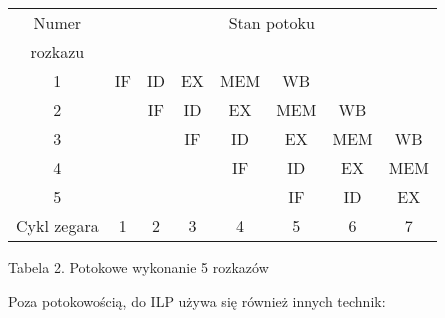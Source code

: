 \documentclass{mwart}
\begin{document}
	\begin{center}
	\begin{tabular}{|c|c|c|c|c|c|c|c|} \hline
	Numer 		 & \multicolumn{7}{c|}{Stan potoku} \\
	rozkazu & \multicolumn{7}{c|}{} \\ \hline
	1 & IF & ID & EX & \cellcolor{yellow} MEM & WB & & \\ \hline
	2 & & IF & ID & \cellcolor{yellow} EX & MEM & WB & \\ \hline
	3 & & & IF & \cellcolor{yellow} ID & EX & MEM & WB \\ \hline
	4 & & & & \cellcolor{yellow} IF & ID & EX & MEM \\ \hline
	5 & & & & \cellcolor{yellow} & IF & ID & EX \\ \hline \hline
	Cykl zegara & 1 & 2 & 3 & \cellcolor{yellow} 4 & 5 & 6 & 7 \\ \hline
	\end{tabular}\par
	\begin{small} Tabela 2. Potokowe wykonanie 5 rozkazów \end{small}
	\end{center}
\par
%
\indent
	Poza potokowością, do ILP używa się również innych technik:
\end{document}

